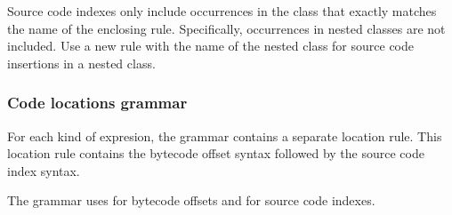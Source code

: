 \documentclass{article}
\begin{document}
Source code indexes only include occurrences in the class that exactly matches
the name of the enclosing  rule. Specifically,
occurrences in nested classes are not included. Use a new
 rule with the name of the nested class for source code
insertions in a nested class.


\subsubsection{Code locations grammar\label{code-grammar}}

For each kind of expresion, the grammar contains a separate location rule.
This location rule contains the bytecode offset syntax followed by the
source code index syntax.

The grammar uses \bnflit{\#} for bytecode offsets and \bnflit{*} for source code indexes.
\end{document}
